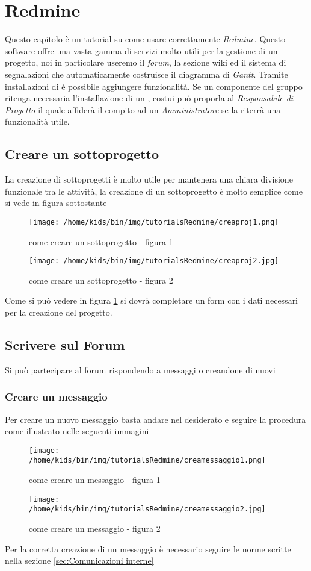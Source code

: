 \documentclass{scalatekids-article}
\begin{document}
\section{Redmine}
Questo capitolo è un tutorial su come usare correttamente \textit{Redmine}.
Questo software offre una vasta gamma di servizi molto utili per la gestione di un progetto, noi in particolare useremo il \textit{forum}, la sezione wiki ed il sistema di segnalazioni che automaticamente costruisce il diagramma di \textit{Gantt}. Tramite installazioni di  è possibile aggiungere funzionalità. Se un componente del gruppo ritenga necessaria l'installazione di un , costui può proporla al \textit{Responsabile di Progetto} il quale affiderà il compito ad un \textit{Amministratore} se la riterrà una funzionalità utile.
\subsection{Creare un sottoprogetto}
La creazione di sottoprogetti è molto utile per mantenera una chiara divisione funzionale tra le attività, la creazione di un sottoprogetto è molto semplice come si vede in figura sottostante
\begin{figure}[H]
  \centering
  \texttt{[image: /home/kids/bin/img/tutorialsRedmine/creaproj1.png]}
  \caption{come creare un sottoprogetto - figura 1}
\end{figure}
\begin{figure}[H]
  \centering
  \texttt{[image: /home/kids/bin/img/tutorialsRedmine/creaproj2.jpg]}
  \caption{come creare un sottoprogetto - figura 2\label{fig:figura-2}}
\end{figure}
Come si può vedere in figura \ref{fig:figura-2} si dovrà completare un form con i dati necessari per la creazione del progetto.
\subsection{Scrivere sul Forum}
Si può partecipare al forum rispondendo a messaggi o creandone di nuovi
\subsubsection{Creare un messaggio}
Per creare un nuovo messaggio basta andare nel  desiderato e seguire la procedura come illustrato nelle seguenti immagini
\begin{figure}[H]
  \centering
  \texttt{[image: /home/kids/bin/img/tutorialsRedmine/creamessaggio1.png]}
  \caption{come creare un messaggio - figura 1}
\end{figure}
\begin{figure}[H]
  \centering
  \texttt{[image: /home/kids/bin/img/tutorialsRedmine/creamessaggio2.jpg]}
  \caption{come creare un messaggio - figura 2}
\end{figure}
Per la corretta creazione di un messaggio è necessario seguire le norme scritte nella sezione \ref{sec:Comunicazioni interne}
\end{document}
